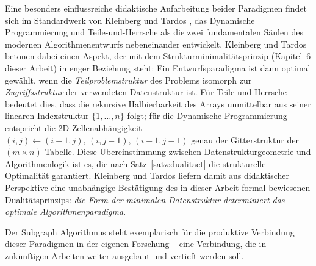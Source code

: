 ﻿\documentclass[a4paper,12pt]{article}
\theoremstyle{definition}
\begin{document}
Eine besonders einflussreiche didaktische Aufarbeitung beider Paradigmen findet sich
im Standardwerk von Kleinberg und Tardos \cite{kleinberg2005}, das Dynamische
Programmierung und Teile-und-Herrsche als die zwei fundamentalen Säulen des
modernen Algorithmenentwurfs nebeneinander entwickelt. Kleinberg und Tardos
betonen dabei einen Aspekt, der mit dem Strukturminimalitätsprinzip (Kapitel~6
dieser Arbeit) in enger Beziehung steht: Ein Entwurfsparadigma ist dann optimal
gewählt, wenn die \emph{Teilproblemstruktur} des Problems isomorph zur
\emph{Zugriffsstruktur} der verwendeten Datenstruktur ist. Für Teile-und-Herrsche
bedeutet dies, dass die rekursive Halbierbarkeit des Arrays unmittelbar aus
seiner linearen Indexstruktur $\{1, \ldots, n\}$ folgt; für die Dynamische
Programmierung entspricht die 2D-Zellenabhängigkeit $(i,j) \leftarrow
(i{-}1,j),\,(i,j{-}1),\,(i{-}1,j{-}1)$ genau der Gitterstruktur der
$(m \times n)$-Tabelle. Diese Übereinstimmung zwischen Datenstrukturgeometrie
und Algorithmenlogik ist es, die nach Satz~\ref{satz:dualitaet} die strukturelle
Optimalität garantiert. Kleinberg und Tardos liefern damit aus didaktischer
Perspektive eine unabhängige Bestätigung des in dieser Arbeit formal bewiesenen
Dualitätsprinzips: \emph{die Form der minimalen Datenstruktur determiniert
das optimale Algorithmenparadigma}.

Der Subgraph Algorithmus \cite{epp2026subgraph} steht exemplarisch für die
produktive Verbindung dieser Paradigmen in der eigenen Forschung -- eine Verbindung,
die in zukünftigen Arbeiten weiter ausgebaut und vertieft werden soll.
\end{document}
